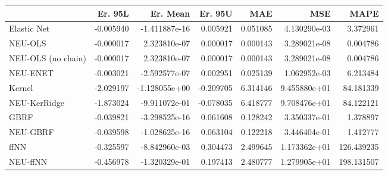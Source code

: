 \begin{tabular}{lrrrrrr}
\toprule
{} &   Er. 95L &      Er. Mean &   Er. 95U &       MAE &           MSE &        MAPE \\
\midrule
Elastic Net        & -0.005940 & -1.411887e-16 &  0.005921 &  0.051085 &  4.130290e-03 &    3.372961 \\
NEU-OLS            & -0.000017 &  2.323810e-07 &  0.000017 &  0.000143 &  3.289021e-08 &    0.004786 \\
NEU-OLS (no chain) & -0.000017 &  2.323810e-07 &  0.000017 &  0.000143 &  3.289021e-08 &    0.004786 \\
NEU-ENET           & -0.003021 & -2.592577e-07 &  0.002951 &  0.025139 &  1.062952e-03 &    6.213484 \\
Kernel             & -2.029197 & -1.128055e+00 & -0.209705 &  6.314146 &  9.455880e+01 &   84.181339 \\
NEU-KerRidge       & -1.873024 & -9.911072e-01 & -0.078035 &  6.418777 &  9.708476e+01 &   84.122121 \\
GBRF               & -0.039821 & -3.298525e-16 &  0.061608 &  0.128242 &  3.350337e-01 &    1.378897 \\
NEU-GBRF           & -0.039598 & -1.028625e-16 &  0.063104 &  0.122218 &  3.446404e-01 &    1.412777 \\
ffNN               & -0.325597 & -8.842960e-03 &  0.304473 &  2.499645 &  1.173362e+01 &  126.439235 \\
NEU-ffNN           & -0.456978 & -1.320329e-01 &  0.197413 &  2.480777 &  1.279905e+01 &  198.131507 \\
\bottomrule
\end{tabular}
